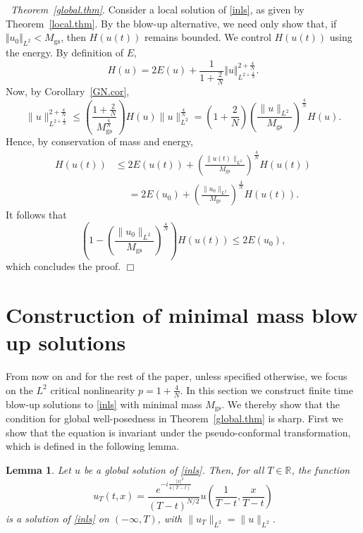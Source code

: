 \documentclass[reqno]{amsart}
\newcommand{\R}{\mathbb{R}}
\let\le=\leqslant
\newcommand{\disp}{\displaystyle}
\newcommand\txt{\textstyle}
\theoremstyle{plain}
\newtheorem{lemma}{Lemma}
\theoremstyle{definition}
\numberwithin{equation}{section}
\newenvironment{proofof}
{\medskip\noindent{\it Proof of}}{\nolinebreak\hfill$\Box$\medskip}
\begin{document}
\begin{proofof}~{\it Theorem~\ref{global.thm}}.
Consider a local solution of \eqref{inls}, as given by Theorem~\ref{local.thm}.
By the blow-up alternative, we need only show that, if $\Vert u_0\Vert_{L^2}<M_\text{gs}$,
then $H(u(t))$ remains bounded. 
We control $H(u(t))$ using the energy. By definition of $E$,
\[
H(u)=2E(u) + \frac{1}{1+\frac2N}\Vert{u}\Vert_{L^{2+\frac4N}}^{2+\frac4N}.
\]
Now, by Corollary~\ref{GN.cor},
\[
\|u\|_{L^{2+\frac4N}}^{2+\frac4N}\le 
\left(\frac{1+\frac2N}{M_\text{gs}^{\frac4N}}\right) H(u)\|u\|_{L^2}^{\frac4N}
=(1+\txt\frac2N)\disp\left(\frac{\|u\|_{L^2}}{M_\text{gs}}\right)^{\frac4N}H(u).
\]
Hence, by conservation of mass and energy,
\begin{align*}
H(u(t))	&\le 2E(u(t))+\left(\frac{\|u(t)\|_{L^2}}{M_\text{gs}}\right)^{\frac4N}H(u(t))\\
		&\phantom{\le}=2E(u_0)+\left(\frac{\|u_0\|_{L^2}}{M_\text{gs}}\right)^{\frac4N}H(u(t)).
\end{align*}
It follows that
\[
\left(1-\left(\frac{\|u_0\|_{L^2}}{M_\text{gs}}\right)^{\frac4N}\right)H(u(t))\le 2 E(u_0),
\]
which concludes the proof.
\end{proofof}



\section{Construction of minimal mass blow up solutions}\label{minmass.sec}

From now on and for the rest of the paper, unless specified otherwise, we focus on
the $L^2$ critical nonlinearity $p=1+\frac4N$.
In this section we construct finite time blow-up solutions to \eqref{inls} 
with minimal mass $M_\mathrm{gs}$. 
We thereby show that the condition for global well-posedness in Theorem~\ref{global.thm} 
is sharp. First we show that the equation is invariant under the pseudo-conformal transformation, 
which is defined in the following lemma. 

\begin{lemma}\label{pseudo-conf.lem}
Let $u$ be a global solution of \eqref{inls}. Then, for all $T\in\R$, the function
\[ 
u_T(t,x)=\frac{e^{-i\frac{|x|^2}{4(T-t)}}}{(T-t)^{N/2}}u\left(\frac{1}{T-t},\frac{x}{T-t}\right)
\]
is a solution of \eqref{inls} on $(-\infty, T)$, with $\|u_T\|_{L^2}=\|u\|_{L^2}$.
\end{lemma}
\end{document}
